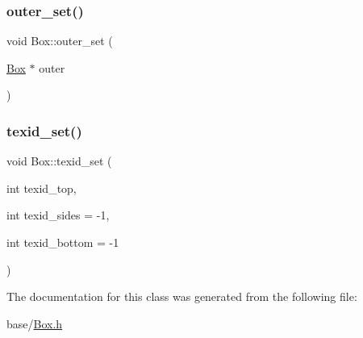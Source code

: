 \subsubsection{\texorpdfstring{outer\+\_\+set()}{outer\_set()}}
{\footnotesize\ttfamily void Box\+::outer\+\_\+set (\begin{DoxyParamCaption}\item[{\mbox{\hyperlink{classBox}{Box}} $\ast$}]{outer }\end{DoxyParamCaption})}

\mbox{\label{classBox_a2a980195f8a6f341bb17c099b2f886ac}} 
\subsubsection{\texorpdfstring{texid\+\_\+set()}{texid\_set()}}
{\footnotesize\ttfamily void Box\+::texid\+\_\+set (\begin{DoxyParamCaption}\item[{int}]{texid\+\_\+top,  }\item[{int}]{texid\+\_\+sides = {\ttfamily -\/1},  }\item[{int}]{texid\+\_\+bottom = {\ttfamily -\/1} }\end{DoxyParamCaption})}



The documentation for this class was generated from the following file\+:\begin{DoxyCompactItemize}
\item 
base/\mbox{\hyperlink{Box_8h}{Box.\+h}}\end{DoxyCompactItemize}
